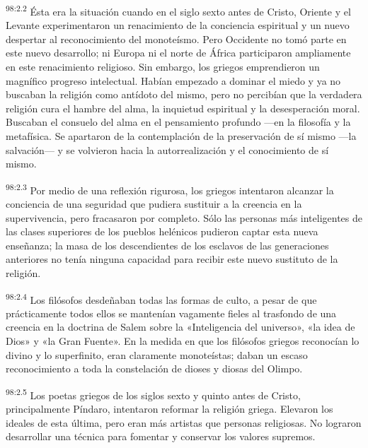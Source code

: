 \par
\textsuperscript{98:2.2} Ésta era la situación cuando en el siglo sexto antes de Cristo, Oriente y el Levante experimentaron un renacimiento de la conciencia espiritual y un nuevo despertar al reconocimiento del monoteísmo. Pero Occidente no tomó parte en este nuevo desarrollo; ni Europa ni el norte de África participaron ampliamente en este renacimiento religioso. Sin embargo, los griegos emprendieron un magnífico progreso intelectual. Habían empezado a dominar el miedo y ya no buscaban la religión como antídoto del mismo, pero no percibían que la verdadera religión cura el hambre del alma, la inquietud espiritual y la desesperación moral. Buscaban el consuelo del alma en el pensamiento profundo ---en la filosofía y la metafísica. Se apartaron de la contemplación de la preservación de sí mismo ---la salvación--- y se volvieron hacia la autorrealización y el conocimiento de sí mismo.

\par
\textsuperscript{98:2.3} Por medio de una reflexión rigurosa, los griegos intentaron alcanzar la conciencia de una seguridad que pudiera sustituir a la creencia en la supervivencia, pero fracasaron por completo. Sólo las personas más inteligentes de las clases superiores de los pueblos helénicos pudieron captar esta nueva enseñanza; la masa de los descendientes de los esclavos de las generaciones anteriores no tenía ninguna capacidad para recibir este nuevo sustituto de la religión.

\par
\textsuperscript{98:2.4} Los filósofos desdeñaban todas las formas de culto, a pesar de que prácticamente todos ellos se mantenían vagamente fieles al trasfondo de una creencia en la doctrina de Salem sobre la «Inteligencia del universo», «la idea de Dios» y «la Gran Fuente». En la medida en que los filósofos griegos reconocían lo divino y lo superfinito, eran claramente monoteístas; daban un escaso reconocimiento a toda la constelación de dioses y diosas del Olimpo.

\par
\textsuperscript{98:2.5} Los poetas griegos de los siglos sexto y quinto antes de Cristo, principalmente Píndaro, intentaron reformar la religión griega. Elevaron los ideales de esta última, pero eran más artistas que personas religiosas. No lograron desarrollar una técnica para fomentar y conservar los valores supremos.

